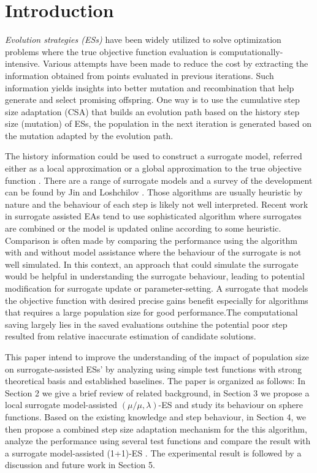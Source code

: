 \section{Introduction}

\textit{Evolution strategies (ESs)} have been widely utilized to solve optimization problems where the true objective function evaluation is computationally-intensive. Various attempts have been made to reduce the cost by extracting the information obtained from points evaluated in previous iterations. Such information yields insights into better mutation and recombination that help generate and select promising offspring. One way is to use the cumulative step size adaptation (CSA) \cite{Ostermeier:1994:DAS:1326675.1326679} that builds an evolution path based on the history step size (mutation) of ESs, the population in the next iteration is generated based on the mutation adapted by the evolution path. 

The history information could be used to construct a surrogate model, referred either as a local approximation or a global approximation to the true objective function \cite{Jin:2002:FAE:2955491.2955686}. There are a range of surrogate models and a survey of the development can be found by Jin \cite{JIN201161} and Loshchilov \cite{ECJ2016_LMCMA}. Those algorithms are usually heuristic by nature and the behaviour of each step is likely not well interpreted. Recent work in surrogate assisted EAs tend to use sophisticated algorithm where surrogates are combined or the model is updated online according to some heuristic. Comparison is often made by comparing the performance using the algorithm with and without model assistance where the behaviour of the surrogate is not well simulated. In this context, an approach that could simulate the surrogate would be helpful in understanding the surrogate behaviour, leading to potential modification for surrogate update or parameter-setting. A surrogate that models the objective function with desired precise gains benefit especially for algorithms that requires a large population size for good performance.The computational saving largely lies in the saved evaluations outshine the potential poor step resulted from relative inaccurate estimation of candidate solutions. 


This paper intend to improve the understanding of the impact of population size on surrogate-assisted ESs' by analyzing using simple test functions with strong theoretical basis and established baselines. The paper is organized as follows: In Section 2 we give a brief review of related background, in Section 3 we propose a local surrogate model-assisted $(\mu/\mu,\lambda)$-ES and study its behaviour on sphere functions. Based on the existing knowledge and step behaviour, in Section 4, we then propose a combined step size adaptation mechanism for the this algorithm, analyze the performance using several test functions and compare the result with a surrogate model-assisted (1+1)-ES \cite{DBLP:conf/ppsn/KayhaniA18}. The experimental result is followed by a discussion and future work in Section 5. 




